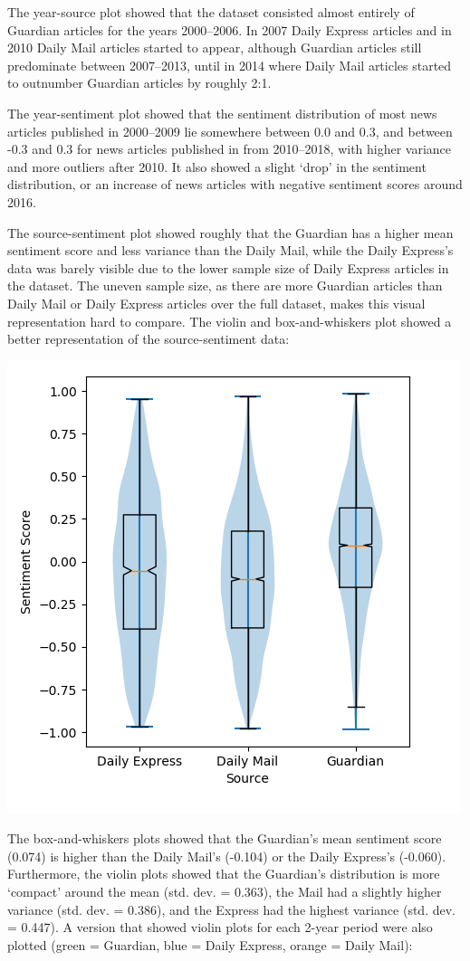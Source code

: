\documentclass{report}
\begin{document}
The year-source plot showed that the dataset consisted almost entirely of Guardian articles for the years 2000--2006. In 2007 Daily Express articles and in 2010 Daily Mail articles started to appear, although Guardian articles still predominate between 2007--2013, until in 2014 where Daily Mail articles started to outnumber Guardian articles by roughly 2:1.

The year-sentiment plot showed that the sentiment distribution of most news articles published in 2000--2009 lie somewhere between 0.0 and 0.3, and between -0.3 and 0.3 for news articles published in from 2010--2018, with higher variance and more outliers after 2010. 
It also showed a slight `drop' in the sentiment distribution, or an increase of news articles with negative sentiment scores around 2016.

The source-sentiment plot showed roughly that the Guardian has a higher mean sentiment score and less variance than the Daily Mail, while the Daily Express's data was barely visible due to the lower sample size of Daily Express articles in the dataset.
The uneven sample size, as there are more Guardian articles than Daily Mail or Daily Express articles over the full dataset, makes this visual representation hard to compare. 
The violin \cite{hintze1998violin} and box-and-whiskers plot \cite{tukey1977exploratory} showed a better representation of the source-sentiment data:

\begin{center}
	\includegraphics[width=0.5\linewidth]{row-3-col-1.png}
\end{center}

The box-and-whiskers plots showed that the Guardian's mean sentiment score (0.074) is higher than the Daily Mail's (-0.104) or the Daily Express's (-0.060).
Furthermore, the violin plots showed that the Guardian's distribution is more `compact' around the mean (std. dev. = 0.363), the Mail had a slightly higher variance (std. dev. = 0.386), and the Express had the highest variance (std. dev. = 0.447). A version that showed violin plots for each 2-year period were also plotted (green = Guardian, blue = Daily Express, orange = Daily Mail):
\end{document}
